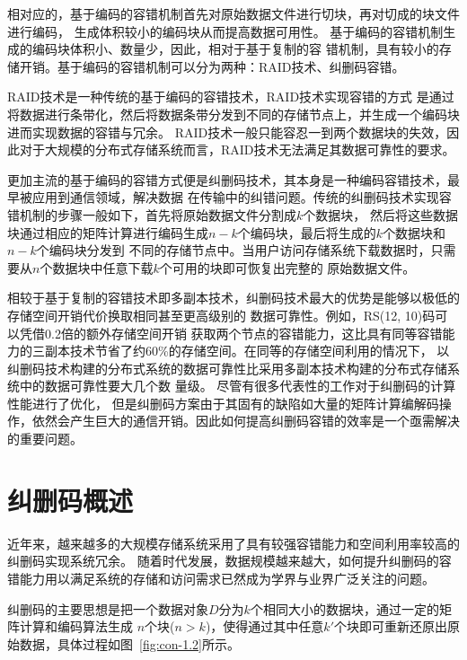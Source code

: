 相对应的，基于编码的容错机制首先对原始数据文件进行切块，再对切成的块文件进行编码，
生成体积较小的编码块从而提高数据可用性。
基于编码的容错机制生成的编码块体积小、数量少，因此，相对于基于复制的容
错机制，具有较小的存储开销。基于编码的容错机制可以分为两种：RAID技术、纠删码容错。

RAID技术\cite{patterson1988case,chen1994raid}是一种传统的基于编码的容错技术，RAID技术实现容错的方式
是通过将数据进行条带化，然后将数据条带分发到不同的存储节点上，并生成一个编码块进而实现数据的容错与冗余。
RAID技术一般只能容忍一到两个数据块的失效，因此对于大规模的分布式存储系统而言，RAID技术无法满足其数据可靠性的要求。

更加主流的基于编码的容错方式便是纠删码技术，其本身是一种编码容错技术，最早被应用到通信领域，解决数据
在传输中的纠错问题。传统的纠删码技术实现容错机制的步骤一般如下，首先将原始数据文件分割成$k$个数据块，
然后将这些数据块通过相应的矩阵计算进行编码生成$n-k$个编码块，最后将生成的$k$个数据块和$n-k$个编码块分发到
不同的存储节点中。当用户访问存储系统下载数据时，只需要从$n$个数据块中任意下载$k$个可用的块即可恢复出完整的
原始数据文件。

相较于基于复制的容错技术即多副本技术，纠删码技术最大的优势是能够以极低的存储空间开销代价换取相同甚至更高级别的
数据可靠性\cite{lin2004erasure,weatherspoon2002erasure}。例如，RS(12, 10)码可以凭借0.2倍的额外存储空间开销
获取两个节点的容错能力，这比具有同等容错能力的三副本技术节省了约60\%的存储空间。在同等的存储空间利用的情况下，
以纠删码技术构建的分布式系统的数据可靠性比采用多副本技术构建的分布式存储系统中的数据可靠性要大几个数
量级\cite{lin2004erasure,weatherspoon2002erasure}。
尽管有很多代表性的工作\citep{huang2019lower,xu1999x,reed1960polynomial,roth1989mds}对于纠删码的计算性能进行了优化，
但是纠删码方案由于其固有的缺陷如大量的矩阵计算编解码操作，依然会产生巨大的通信开销。因此如何提高纠删码容错的效率是一个亟需解决的重要问题。

\section{纠删码概述}
近年来，越来越多的大规模存储系统采用了具有较强容错能力和空间利用率较高的纠删码实现系统冗余\citep{xia2007robustore,kubiatowicz2000oceanstore}。
随着时代发展，数据规模越来越大，如何提升纠删码的容错能力用以满足系统的存储和访问需求已然成为学界与业界广泛关注的问题。

纠删码的主要思想是把一个数据对象$D$分为$k$个相同大小的数据块，通过一定的矩阵计算和编码算法生成
$n$个块($n>k$)，使得通过其中任意$k'$个块即可重新还原出原始数据，具体过程如图~\ref{fig:con-1.2}所示。

